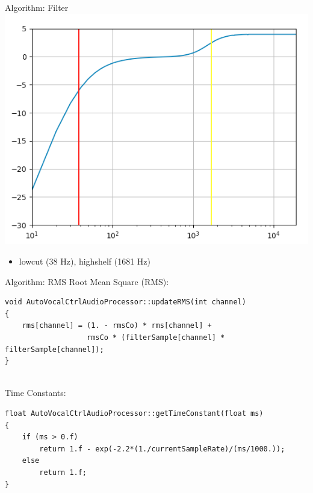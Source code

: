\begin{frame}[c]{Algorithm: Filter}{}
	\includegraphics[scale=0.3]{images/filter}
	\centering\\
	\bigskip
    \begin{itemize}
    		\item lowcut (38 Hz), highshelf (1681 Hz) 
    \end{itemize}

    \printbibliography%
\end{frame}

\begin{frame}[fragile]{Algorithm: RMS}{}
	Root Mean Square (RMS):
	\lstset{language=C++}
	\begin{lstlisting}[basicstyle=\tiny]
void AutoVocalCtrlAudioProcessor::updateRMS(int channel)
{
    rms[channel] = (1. - rmsCo) * rms[channel] +
                   rmsCo * (filterSample[channel] * filterSample[channel]);
}
	\end{lstlisting}
	\\
	\bigskip
	Time Constants:
	\begin{lstlisting}[basicstyle=\tiny]
float AutoVocalCtrlAudioProcessor::getTimeConstant(float ms)
{
    if (ms > 0.f)
        return 1.f - exp(-2.2*(1./currentSampleRate)/(ms/1000.));
    else
        return 1.f;
}
	\end{lstlisting}
	\footnotemark[2]
	
    \printbibliography%
\end{frame}

